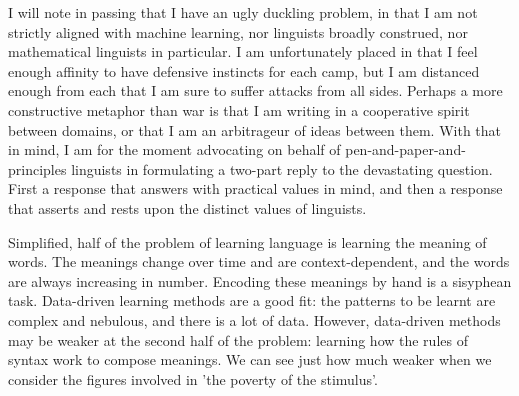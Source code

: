 I will note in passing that I have an ugly duckling problem, in that I am not strictly aligned with machine learning, nor linguists broadly construed, nor mathematical linguists in particular. I am unfortunately placed in that I feel enough affinity to have defensive instincts for each camp, but I am distanced enough from each that I am sure to suffer attacks from all sides. Perhaps a more constructive metaphor than war is that I am writing in a cooperative spirit between domains, or that I am an arbitrageur of ideas between them. With that in mind, I am for the moment advocating on behalf of pen-and-paper-and-principles linguists in formulating a two-part reply to the devastating question. First a response that answers with practical values in mind, and then a response that asserts and rests upon the distinct values of linguists.


Simplified, half of the problem of learning language is learning the meaning of words. The meanings change over time and are  context-dependent, and the words are always increasing in number. Encoding these meanings by hand is a sisyphean task. Data-driven learning methods are a good fit: the patterns to be learnt are complex and nebulous, and there is a lot of data. However, data-driven methods may be weaker at the second half of the problem: learning how the rules of syntax work to compose meanings. We can see just how much weaker when we consider the figures involved in 'the poverty of the stimulus'.\\

